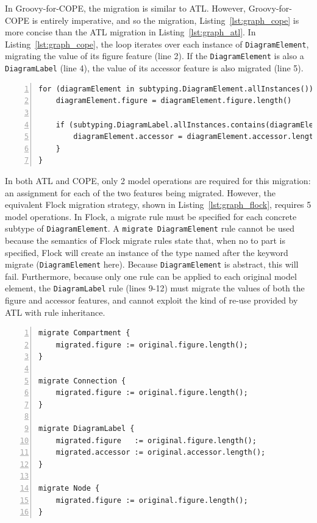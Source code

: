 In Groovy-for-COPE, the migration is similar to ATL. However, Groovy-for-COPE is entirely imperative, and so the migration, Listing~\ref{lst:graph_cope} is more concise than the ATL migration in Listing~\ref{lst:graph_atl}. In Listing~\ref{lst:graph_cope}, the loop iterates over each instance of \texttt{DiagramElement}, migrating the value of its figure feature (line 2). If the \texttt{DiagramElement} is also a \texttt{DiagramLabel} (line 4), the value of its accessor feature is also migrated (line 5).

\begin{lstlisting}[basicstyle=\ttfamily\footnotesize, flexiblecolumns=true, numbers=left, nolol=true, caption=Simplified GMF Graph model migration in COPE, label=lst:graph_cope, language=COPE, tabsize=2]
for (diagramElement in subtyping.DiagramElement.allInstances()) {
	diagramElement.figure = diagramElement.figure.length()
	
	if (subtyping.DiagramLabel.allInstances.contains(diagramElement)) {
		diagramElement.accessor = diagramElement.accessor.length()
	}
}
\end{lstlisting}

In both ATL and COPE, only 2 model operations are required for this migration: an assignment for each of the two features being migrated. However, the equivalent Flock migration strategy, shown in Listing~\ref{lst:graph_flock}, requires 5 model operations. In Flock, a migrate rule must be specified for each concrete subtype of \texttt{DiagramElement}. A \texttt{migrate DiagramElement} rule cannot be used because the semantics of Flock migrate rules state that, when no to part is specified, Flock will create an instance of the type named after the keyword migrate (\texttt{DiagramElement} here). Because \texttt{DiagramElement} is abstract, this will fail. Furthermore, because only one rule can be applied to each original model element, the \texttt{DiagramLabel} rule (lines 9-12) must migrate the values of both the figure and accessor features, and cannot exploit the kind of re-use provided by ATL with rule inheritance.

\begin{lstlisting}[basicstyle=\ttfamily\footnotesize, flexiblecolumns=true, numbers=left, nolol=true, caption=Simplified GMF Graph model migration in Flock, label=lst:graph_flock, language=Flock, tabsize=2]
migrate Compartment {
	migrated.figure := original.figure.length();
}

migrate Connection {
	migrated.figure := original.figure.length();
}

migrate DiagramLabel {
	migrated.figure   := original.figure.length();
	migrated.accessor := original.accessor.length();
}

migrate Node {
	migrated.figure := original.figure.length();
}
\end{lstlisting}

